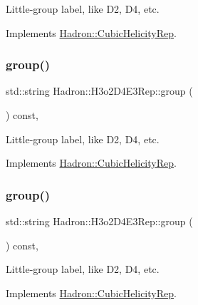 Little-\/group label, like D2, D4, etc. 

Implements \mbox{\hyperlink{structHadron_1_1CubicHelicityRep_a101a7d76cd8ccdad0f272db44b766113}{Hadron\+::\+Cubic\+Helicity\+Rep}}.

\mbox{\label{structHadron_1_1H3o2D4E3Rep_acfb5a306823b56f4e03d1c7f818de23c}} 
\subsubsection{\texorpdfstring{group()}{group()}\hspace{0.1cm}{\footnotesize\ttfamily [2/3]}}
{\footnotesize\ttfamily std\+::string Hadron\+::\+H3o2\+D4\+E3\+Rep\+::group (\begin{DoxyParamCaption}{ }\end{DoxyParamCaption}) const\hspace{0.3cm}{\ttfamily [inline]}, {\ttfamily [virtual]}}

Little-\/group label, like D2, D4, etc. 

Implements \mbox{\hyperlink{structHadron_1_1CubicHelicityRep_a101a7d76cd8ccdad0f272db44b766113}{Hadron\+::\+Cubic\+Helicity\+Rep}}.

\mbox{\label{structHadron_1_1H3o2D4E3Rep_acfb5a306823b56f4e03d1c7f818de23c}} 
\subsubsection{\texorpdfstring{group()}{group()}\hspace{0.1cm}{\footnotesize\ttfamily [3/3]}}
{\footnotesize\ttfamily std\+::string Hadron\+::\+H3o2\+D4\+E3\+Rep\+::group (\begin{DoxyParamCaption}{ }\end{DoxyParamCaption}) const\hspace{0.3cm}{\ttfamily [inline]}, {\ttfamily [virtual]}}

Little-\/group label, like D2, D4, etc. 

Implements \mbox{\hyperlink{structHadron_1_1CubicHelicityRep_a101a7d76cd8ccdad0f272db44b766113}{Hadron\+::\+Cubic\+Helicity\+Rep}}.

